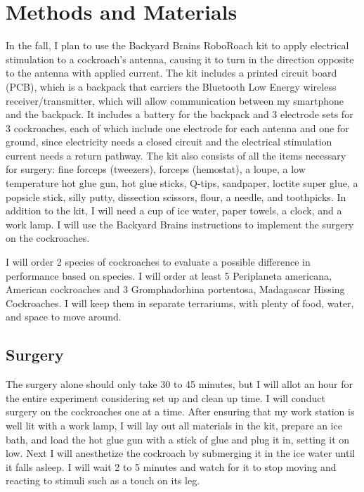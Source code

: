 \section{Methods and Materials}


In the fall, I plan to use the Backyard Brains RoboRoach kit to apply electrical stimulation to a cockroach's antenna, causing it to turn in the direction opposite to the antenna with applied current. The kit includes a printed circuit board (PCB), which is a backpack that carriers the Bluetooth Low Energy wireless receiver/transmitter, which will allow communication between my smartphone and the backpack. It includes a battery for the backpack and 3 electrode sets for 3 cockroaches, each of which include one electrode for each antenna and one for ground, since electricity needs a closed circuit and the electrical stimulation current needs a return pathway. The kit also consists of all the items necessary for surgery: fine forceps (tweezers), forceps (hemostat), a loupe, a low temperature hot glue gun, hot glue sticks, Q-tips, sandpaper, loctite super glue, a popsicle stick, silly putty, dissection scissors, flour, a needle, and toothpicks. In addition to the kit, I will need a cup of ice water, paper towels, a clock, and a work lamp. I will use the Backyard Brains instructions to implement the surgery on the cockroaches.

\bigskip

I will order 2 species of cockroaches to evaluate a possible difference in performance based on species. I will order at least 5 Periplaneta americana, American cockroaches and 3 Gromphadorhina portentosa, Madagascar Hissing Cockroaches. I will keep them in separate terrariums, with plenty of food, water, and space to move around.

\bigskip

\subsection{Surgery}

The surgery alone should only take 30 to 45 minutes, but I will allot an hour for the entire experiment considering set up and clean up time. I will conduct surgery on the cockroaches one at a time. After ensuring that my work station is well lit with a work lamp, I will lay out all materials in the kit, prepare an ice bath, and load the hot glue gun with a stick of glue and plug it in, setting it on low. Next I will anesthetize the cockroach by submerging it in the ice water until it falls asleep. I will wait 2 to 5 minutes and watch for it to stop moving and reacting to stimuli such as a touch on its leg.



